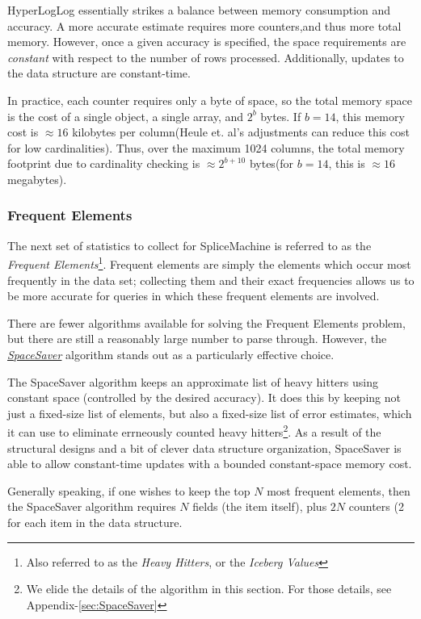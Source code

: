 HyperLogLog essentially strikes a balance between memory consumption and accuracy. A more accurate estimate requires more counters,and thus more total memory. However, once a given accuracy is specified, the space requirements are \emph{constant} with respect to the number of rows processed. Additionally, updates to the data structure are constant-time. 

In practice, each counter requires only a byte of space, so the total memory space is the cost of a single object, a single array, and $2^b$ bytes. If $b=14$, this memory cost is $\approx 16$ kilobytes per column(Heule et. al's adjustments can reduce this cost for low cardinalities\cite{HyperLogLogGoogle}). Thus, over the maximum 1024 columns, the total memory footprint due to cardinality checking is $\approx 2^{b+10}$ bytes(for $b=14$, this is $\approx 16$ megabytes).

\subsubsection{Frequent Elements}
The next set of statistics to collect for SpliceMachine is referred to as the \emph{Frequent Elements}\footnote{Also referred to as the \emph{Heavy Hitters}, or the \emph{Iceberg Values}}. Frequent elements are simply the elements which occur most frequently in the data set; collecting them and their exact frequencies allows us to be more accurate for queries in which these frequent elements are involved.

There are fewer algorithms available for solving the Frequent Elements problem, but there are still a reasonably large number to parse through. However, the \hyperref[sec:SpaceSaver]{\emph{SpaceSaver}} algorithm stands out as a particularly effective choice.

The SpaceSaver algorithm keeps an approximate list of heavy hitters using constant space (controlled by the desired accuracy). It does this by keeping not just a fixed-size list of elements, but also a fixed-size list of error estimates, which it can use to eliminate errneously counted heavy hitters\footnote{We elide the details of the algorithm in this section. For those details, see Appendix-\ref{sec:SpaceSaver}}. As a result of the structural designs and a bit of clever data structure organization, SpaceSaver is able to allow constant-time updates with a bounded constant-space memory cost.

Generally speaking, if one wishes to keep the top $N$ most frequent elements, then the SpaceSaver algorithm requires $N$ fields (the item itself), plus $2N$ counters (2 for each item in the data structure. 

